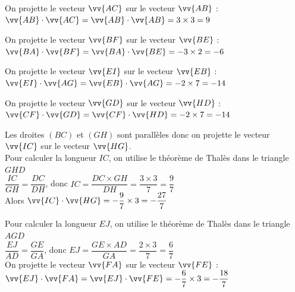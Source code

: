 \documentclass[11pt,a4paper]{article}  %
\begin{document}
\begin{corrBox}
	\begin{enumMet}
		\item On projette le vecteur $\vv{A C}$ sur le vecteur $\vv{A B}$ :\\
		$\vv{A B} \cdot \vv{A C}=\vv{A B} \cdot \vv{A B}=3 \times 3=9$
		\item On projette le vecteur $\vv{B F}$ sur le vecteur $\vv{B E}$ :\\
		$\vv{B A} \cdot \vv{B F}=\vv{B A} \cdot \vv{B E}=-3 \times 2=-6$
		\item On projette le vecteur $\vv{E I}$ sur le vecteur $\vv{E B}$ :\\
		$\vv{E I} \cdot \vv{A G}=\vv{E B} \cdot \vv{A G}=-2 \times 7=-14$
		\item On projette le vecteur $\vv{G D}$ sur le vecteur $\vv{H D}$ :\\
		$\vv{C F} \cdot \vv{G D}=\vv{C F} \cdot \vv{H D}=-2 \times 7=-14$
		\item Les droites $(B C)$ et $(G H)$ sont parallèles donc on projette le vecteur $\vv{I C}$ sur le vecteur $\vv{H G}$.\\
		Pour calculer la longueur $I C$, on utilise le théorème de Thalès dans le triangle $G H D$\\
		$\dfrac{I C}{G H}=\dfrac{D C}{D H}$, donc $ I C=\dfrac{D C \times G H}{D H}=\dfrac{3 \times 3}{7}=\dfrac{9}{7}$\\
		Alors $\vv{I C} \cdot \vv{H G}=-\dfrac{9}{7} \times 3=-\dfrac{27}{7}$
		\item Pour calculer la longueur $E J$, on utilise le théorème de Thalès dans le triangle $A G D$\\
		$\dfrac{E J}{A D}=\dfrac{G E}{G A}$, donc $ E J=\dfrac{G E \times A D}{G A}=\dfrac{2 \times 3}{7}=\dfrac{6}{7}$\\
		On projette le vecteur $\vv{F A}$ sur le vecteur $\vv{F E}$ :\\
		$\vv{E J} \cdot \vv{F A}=\vv{E J} \cdot \vv{F E}=-\dfrac{6}{7} \times 3=-\dfrac{18}{7}$
	\end{enumMet}	
\end{corrBox}
\end{document}
